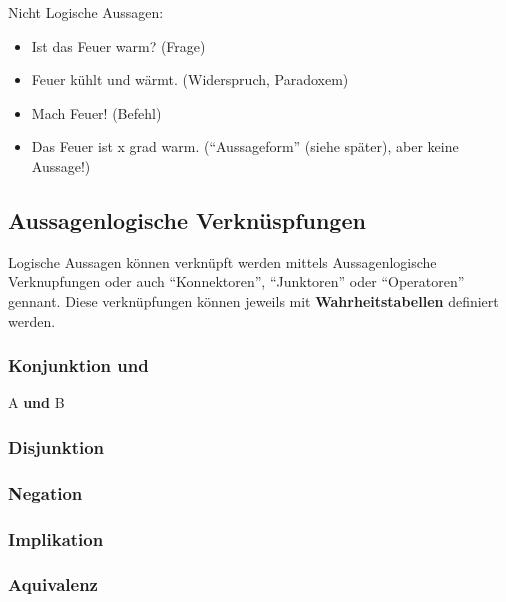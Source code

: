 \documentclass{article}
\begin{document}
Nicht Logische Aussagen:
\begin{itemize}
  \item Ist das Feuer warm? (Frage)
  \item Feuer kühlt und wärmt. (Widerspruch, Paradoxem)
  \item Mach Feuer! (Befehl)
  \item Das Feuer ist x grad warm. (“Aussageform” (siehe später), aber keine Aussage!)
\end{itemize}

\subsection{Aussagenlogische Verknüspfungen}
Logische Aussagen können verknüpft werden mittels Aussagenlogische Verknupfungen oder auch “Konnektoren”, “Junktoren” oder “Operatoren” gennant. Diese verknüpfungen können jeweils mit \textbf{Wahrheitstabellen} definiert werden.

\subsubsection{Konjunktion und}
A \textbf{und} B


 
\subsubsection{Disjunktion}
\subsubsection{Negation}
\subsubsection{Implikation}
\subsubsection{Aquivalenz}
\end{document}
